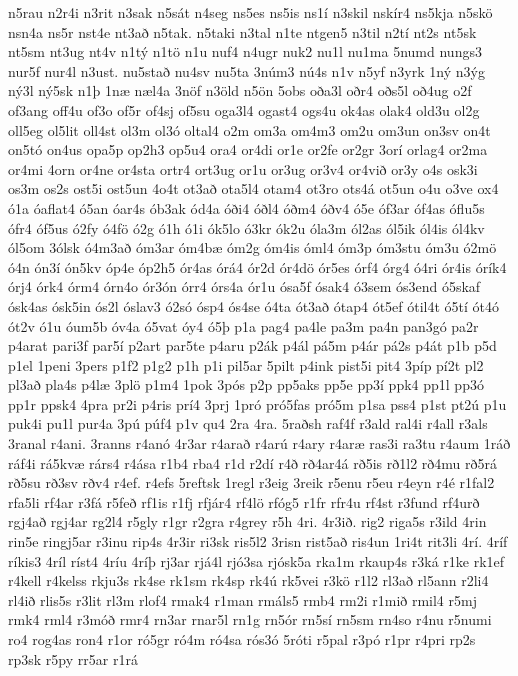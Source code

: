 {n5rau
n2r4i
n3rit
n3sak
n5sát
n4seg
ns5es
ns5is
ns1í
n3skil
nskír4
ns5kja
n5skö
nsn4a
ns5r
nst4e
nt3að
n5tak.
n5taki
n3tal
n1te
ntgen5
n3til
n2tí
nt2s
nt5sk
nt5sm
nt3ug
nt4v
n1tý
n1tö
n1u
nuf4
n4ugr
nuk2
nu1l
nu1ma
5numd
nungs3
nur5f
nur4l
n3ust.
nu5stað
nu4sv
nu5ta
3núm3
nú4s
n1v
n5yf
n3yrk
1ný
n3ýg
ný3l
ný5sk
n1þ
1næ
næl4a
3nöf
n3öld
n5ön
5obs
oða3l
oðr4
oðs5l
oð4ug
o2f
of3ang
off4u
of3o
of5r
of4sj
of5su
oga3l4
ogast4
ogs4u
ok4as
olak4
old3u
ol2g
oll5eg
ol5lit
oll4st
ol3m
ol3ó
oltal4
o2m
om3a
om4m3
om2u
om3un
on3sv
on4t
on5tó
on4us
opa5p
op2h3
op5u4
ora4
or4di
or1e
or2fe
or2gr
3orí
orlag4
or2ma
or4mi
4orn
or4ne
or4sta
ortr4
ort3ug
or1u
or3ug
or3v4
or4við
or3y
o4s
osk3i
os3m
os2s
ost5i
ost5un
4o4t
ot3að
ota5l4
otam4
ot3ro
ots4á
ot5un
o4u
o3ve
ox4
ó1a
óaflat4
ó5an
óar4s
ób3ak
ód4a
óði4
óðl4
óðm4
óðv4
ó5e
óf3ar
óf4as
óflu5s
ófr4
óf5us
ó2fy
ó4fö
ó2g
ó1h
ó1i
ók5lo
ó3kr
ók2u
óla3m
ól2as
ól5ik
ól4is
ól4kv
ól5om
3ólsk
ó4m3að
óm3ar
óm4bæ
óm2g
óm4is
óml4
óm3p
óm3stu
óm3u
ó2mö
ó4n
ón3í
ón5kv
óp4e
óp2h5
ór4as
órá4
ór2d
ór4dö
ór5es
órf4
órg4
ó4ri
ór4is
órík4
órj4
órk4
órm4
órn4o
ór3ón
órr4
órs4a
ór1u
ósa5f
ósak4
ó3sem
ós3end
ó5skaf
ósk4as
ósk5in
ós2l
óslav3
ó2só
ósp4
ós4se
ó4ta
ót3að
ótap4
ót5ef
ótil4t
ó5tí
ót4ó
ót2v
ó1u
óum5b
óv4a
ó5vat
óy4
ó5þ
p1a
pag4
pa4le
pa3m
pa4n
pan3gó
pa2r
p4arat
pari3f
par5í
p2art
par5te
p4aru
p2ák
p4ál
pá5m
p4ár
pá2s
p4át
p1b
p5d
p1el
1peni
3pers
p1f2
p1g2
p1h
p1i
pil5ar
5pilt
p4ink
pist5i
pit4
3píp
pí2t
pl2
pl3að
pla4s
p4læ
3plö
p1m4
1pok
3pós
p2p
pp5aks
pp5e
pp3í
ppk4
pp1l
pp3ó
pp1r
ppsk4
4pra
pr2i
p4ris
prí4
3prj
1pró
pró5fas
pró5m
p1sa
pss4
p1st
pt2ú
p1u
puk4i
pu1l
pur4a
3pú
púf4
p1v
qu4
2ra
4ra.
5raðsh
raf4f
r3ald
ral4i
r4all
r3als
3ranal
r4ani.
3ranns
r4anó
4r3ar
r4arað
r4arú
r4ary
r4aræ
ras3i
ra3tu
r4aum
1ráð
ráf4i
rá5kvæ
rárs4
r4ása
r1b4
rba4
r1d
r2dí
r4ð
rð4ar4á
rð5is
rð1l2
rð4mu
rð5rá
rð5su
rð3sv
rðv4
r4ef.
r4efs
5reftsk
1regl
r3eig
3reik
r5enu
r5eu
r4eyn
r4é
r1fal2
rfa5li
rf4ar
r3fá
r5feð
rf1is
r1fj
rfjár4
rf4lö
rfóg5
r1fr
rfr4u
rf4st
r3fund
rf4urð
rgj4að
rgj4ar
rg2l4
r5gly
r1gr
r2gra
r4grey
r5h
4ri.
4r3ið.
rig2
riga5s
r3ild
4rin
rin5e
ringj5ar
r3inu
rip4s
4r3ir
ri3sk
ris5l2
3risn
rist5að
ris4un
1ri4t
rit3li
4rí.
4ríf
ríkis3
4ríl
ríst4
4ríu
4ríþ
rj3ar
rjá4l
rjó3sa
rjósk5a
rka1m
rkaup4s
r3ká
r1ke
rk1ef
r4kell
r4kelss
rkju3s
rk4se
rk1sm
rk4sp
rk4ú
rk5vei
r3kö
r1l2
rl3að
rl5ann
r2li4
rl4ið
rlis5s
r3lit
rl3m
rlof4
rmak4
r1man
rmáls5
rmb4
rm2i
r1mið
rmil4
r5mj
rmk4
rml4
r3móð
rmr4
rn3ar
rnar5l
rn1g
rn5ór
rn5sí
rn5sm
rn4so
r4nu
r5numi
ro4
rog4as
ron4
r1or
ró5gr
ró4m
ró4sa
rós3ó
5róti
r5pal
r3pó
r1pr
r4pri
rp2s
rp3sk
r5py
rr5ar
r1rá
}
